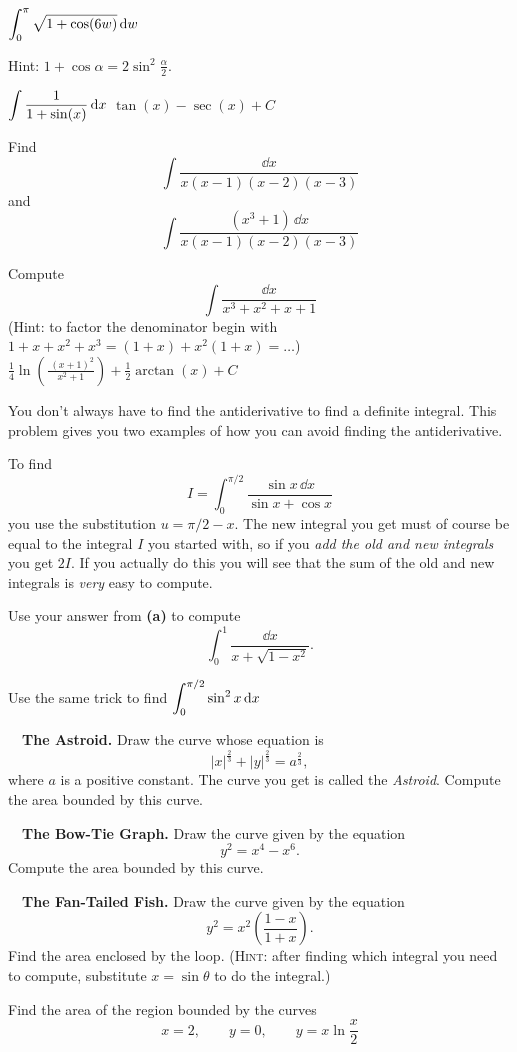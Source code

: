 \begin{multicols}{2}
\problem \(\displaystyle \int_0^\pi\sqrt{1 + \cos(6w)} \, \mathrm{d} w \) %

Hint: $1+\cos \alpha = 2\sin^2\frac{\alpha}{2}$.

\problem \(\displaystyle \int \frac{1}{1 + \sin(x)} \, \mathrm{d} x \) %
\answer %
$\tan(x)-\sec(x)+C$
\endanswer

\problem Find %
\[
\int \frac{\dd x}{x(x-1)(x-2)(x-3)}
\]
and
\[
\int \frac{(x^3+1) \,\dd x}{x(x-1)(x-2)(x-3)}
\]

\problem Compute %
\[
\int \frac{\dd x}{x^3+x^2+x+1}
\]
(Hint: to factor the denominator begin with $1+x+x^2+x^3 = (1+x) + x^2(1+x) = 
\ldots$)
\answer %
$\frac14\ln(\frac{\;(x+1)^2}{x^2+1})+\frac12\arctan(x)+C$
\endanswer


\problem \groupproblem  You don't always have to find the %
antiderivative to find a definite integral. This problem gives you two
examples of how you can avoid finding the antiderivative.

\subprob To find
\[
I=\int^{\pi /2}_0 \frac{\sin x\,\dd x}{\sin x+\cos x}
\]
you use the substitution $u=\pi /2-x$. The new integral you get must
of course be equal to the integral $I$ you started with, so if you
\textit{add the old and new integrals} you get $2I$. If you actually
do this you will see that the sum of the old and new integrals is
\textit{very} easy to compute.

\subprob Use your answer from {\bfseries(a)} to compute
\[
\int_0^1 \frac{\dd x}{x+\sqrt{1-x^2}}.
\]

\subprob Use the same trick to find $\displaystyle \int_0^{\pi/2} \sin^2 x\,\mathrm{d}
x$

\problem  \carefulnow\ \  \textbf{The Astroid. } Draw the curve whose equation is %
\[
|x|^{\frac 23} + |y|^{\frac 23}=a^{\frac 23},
\]
where $a$ is a positive constant.  The curve you get is called the \emph{Astroid}.
Compute the area bounded by this curve.

\problem \carefulnow\ \ \textbf{The Bow-Tie Graph. } Draw the curve given by the %
equation
\[
y^2=x^4-x^6.
\]
Compute the area bounded by this curve.

\problem \carefulnow\ \ \textbf{The Fan-Tailed Fish. } Draw the curve given by %
the equation
\[
y^2=x^2\left( \frac{1-x}{1+x}\right).
\]
Find the area enclosed by the loop.
(\textsc{Hint}: after finding which integral you need to compute, substitute
$x=\sin\theta$ to do the integral.)

\problem %
Find the area of the region bounded by the curves
\[
x = 2,\qquad  y = 0,\qquad y =  x\ln\frac x2
\]


\end{multicols}
